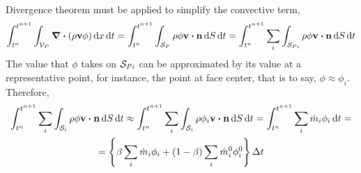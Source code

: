 Divergence theorem must be applied to simplify the convective term,
\begin{equation} 
	\int_{t^n}^{t^{n+1}} \int_{\cv{P}} \div(\rho \vb{v} \phi) \dd{x} \dd{t} = 
	\int_{t^n}^{t^{n+1}} \int_{\cs{P}} \rho \phi \vb{v} \vdot \vb{n} \dd{S} \dd{t} = 
	\int_{t^n}^{t^{n+1}} \sum_i \int_{\cs{Pi}} \rho \phi \vb{v} \vdot \vb{n} \dd{S} \dd{t}
\end{equation}
The value that $\phi$ takes on $\mathcal{S}_{Pi}$ can be approximated by its value at a
representative point, for instance, the point at face center, that is to say,
$\phi \approx \phi_i$. Therefore,
\begin{multline}
	\int_{t^n}^{t^{n+1}} \sum_i \int_{\mathcal{S}_i} \rho \phi \vb{v} \vdot \vb{n} \dd{S} \dd{t} \approx 
	\int_{t^n}^{t^{n+1}} \sum_i \int_{\mathcal{S}_i} \rho \phi_i \vb{v} \vdot \vb{n} \dd{S} \dd{t} =
	\int_{t^n}^{t^{n+1}} \sum_i \dot{m}_i \phi_i \dd{t} = \\
	= \left\{ \beta \sum_i \dot{m}_i \phi_i + (1 - \beta) \sum_i \dot{m}_i^0 \phi_i^0 \right\} \Delta t	
\end{multline}

